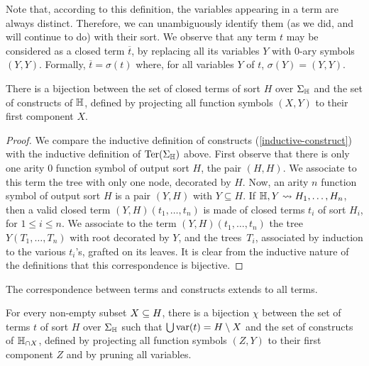 \begin{rem} \label{open-to-closed}
  Note that, according to this definition, the variables appearing in a term are always distinct. 
  Therefore, we can unambiguously identify them (as we did, and will continue to do) with their  sort.
We 
observe that any term $t$ may be considered as a closed term $\overline{t}$, by replacing all its variables $Y$ with $0$-ary symbols $(Y,Y)$. Formally, $\overline{t}=\sigma(t)$ where, for all variables $Y$ of $t$, $\sigma(Y)=(Y,Y)$.
\end{rem}

\begin{lemma} 
  \label{l:bijection-terms}
  There is a bijection between the set of closed terms of  sort $H$ over $\Sigma_{\mathbb H}$ and the set of constructs of ${\mathbb H}$, defined by projecting all function symbols $(X,Y)$ to their first component $X$.
\end{lemma}

\begin{proof}
  We compare the inductive definition of constructs (\cref{inductive-construct}) with the inductive definition of $\operatorname{Ter}(\Sigma_{\mathbb H})$ above.
  First observe that there is only one arity $0$ function symbol of output sort $H$, the pair $(H,H)$. 
  We associate to this term the tree with only one node, decorated by $H$.
  Now, an arity $n$ function symbol of output sort $H$ is a pair $(Y,H)$ with $Y \subseteq H$. 
  If ${\mathbb H},Y \leadsto H_1,\ldots,H_n$, then a valid closed term $(Y,H)(t_1,\ldots,t_n)$ is made of closed terms $t_i$ of  sort $H_i$, for $1 \leq i \leq n$. 
  We associate to the term $(Y,H)(t_1,\ldots,t_n)$ the tree $Y(T_1,\ldots,T_n)$ with root decorated by $Y$, and the trees~$T_i$, associated by induction to the various $t_i$'s, grafted on its leaves.
  It is clear from the inductive nature of the definitions that this correspondence is bijective.
\end{proof}

The correspondence between terms and constructs extends to all terms.

\begin{lemma} 
  \label{l:bijection-open}
  For every non-empty subset $X\subseteq H$,
 there is a bijection $\chi$ between the set of  terms $t$ of  sort $H$ over $\Sigma_{\mathbb H}$  such that $\bigcup \operatorname{var}(t)=H\setminus X$ and the set of constructs of ${\mathbb H}_{\cap X}$, 
 defined by projecting all function symbols $(Z,Y)$ to their first component $Z$ and by pruning all variables.
\end{lemma}


